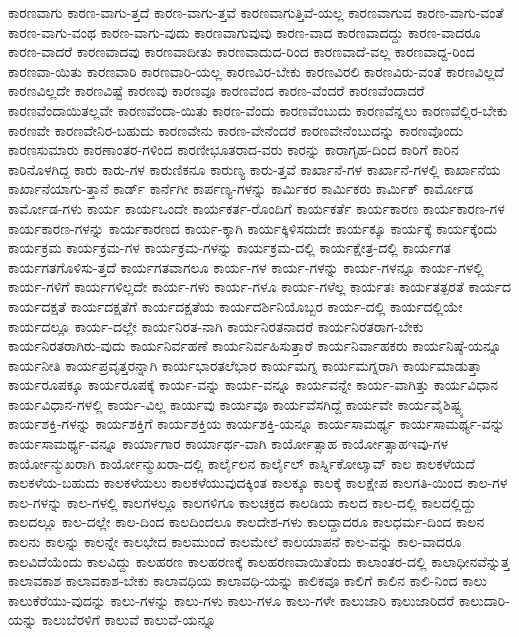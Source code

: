 {ಕಾರಣವಾಗು
ಕಾರಣ-ವಾಗು-ತ್ತದೆ
ಕಾರಣ-ವಾಗು-ತ್ತವೆ
ಕಾರಣವಾಗುತ್ತಿವೆ-ಯಲ್ಲ
ಕಾರಣವಾಗುವ
ಕಾರಣ-ವಾಗು-ವಂತೆ
ಕಾರಣ-ವಾಗು-ವಂಥ
ಕಾರಣ-ವಾಗು-ವುದು
ಕಾರಣವಾಗುವುವು
ಕಾರಣ-ವಾದ
ಕಾರಣವಾದದ್ದು
ಕಾರಣ-ವಾದರೂ
ಕಾರಣ-ವಾದರೆ
ಕಾರಣವಾದವು
ಕಾರಣವಾದೀತು
ಕಾರಣವಾದುದ-ರಿಂದ
ಕಾರಣವಾದೆ-ವಲ್ಲ
ಕಾರಣವಾದ್ದ-ರಿಂದ
ಕಾರಣವಾ-ಯಿತು
ಕಾರಣವಾರಿ
ಕಾರಣವಾರಿ-ಯಲ್ಲ
ಕಾರಣವಿರ-ಬೇಕು
ಕಾರಣವಿರಲಿ
ಕಾರಣವಿರು-ವಂತೆ
ಕಾರಣವಿಲ್ಲದೆ
ಕಾರಣವಿಲ್ಲದೇ
ಕಾರಣವಿಷ್ಟೆ
ಕಾರಣವು
ಕಾರಣವೂ
ಕಾರಣವೆಂದ
ಕಾರಣ-ವೆಂದರೆ
ಕಾರಣವೆಂದಾದರೆ
ಕಾರಣವೆಂದಾಯಿತಲ್ಲವೇ
ಕಾರಣವೆಂದಾ-ಯಿತು
ಕಾರಣ-ವೆಂದು
ಕಾರಣವೆಂಬುದು
ಕಾರಣವೆನ್ನಲು
ಕಾರಣವೆಲ್ಲಿರ-ಬೇಕು
ಕಾರಣವೇ
ಕಾರಣವೇನಿರ-ಬಹುದು
ಕಾರಣವೇನು
ಕಾರಣ-ವೇನೆಂದರೆ
ಕಾರಣವೇನೆಂಬುದನ್ನು
ಕಾರಣವೊಂದು
ಕಾರಣಸುಮಾರು
ಕಾರಣಾಂತರ-ಗಳಿಂದ
ಕಾರಣೀಭೂತರಾದ-ವರು
ಕಾರನ್ನು
ಕಾರಾಗೃಹ-ದಿಂದ
ಕಾರಿಗೆ
ಕಾರಿನ
ಕಾರಿನೊಳಗಿದ್ದ
ಕಾರು
ಕಾರು-ಗಳ
ಕಾರುಣಿಕನೂ
ಕಾರುಣ್ಯ
ಕಾರು-ತ್ತವೆ
ಕಾರ್ಖಾನೆ-ಗಳ
ಕಾರ್ಖಾನೆ-ಗಳಲ್ಲಿ
ಕಾರ್ಖಾನೆಯ
ಕಾರ್ಖಾನೆಯಾಗು-ತ್ತಾನೆ
ಕಾರ್ಡ್
ಕಾರ್ನೆಗೀ
ಕಾರ್ಪಣ್ಯ-ಗಳನ್ನು
ಕಾರ್ಮಿಕರ
ಕಾರ್ಮಿಕರು
ಕಾರ್ಮಿಕ್
ಕಾರ್ಮೋಡ
ಕಾರ್ಮೋಡ-ಗಳು
ಕಾರ್ಯ
ಕಾರ್ಯಒಂದೇ
ಕಾರ್ಯಕರ್ತ-ರೊಂದಿಗೆ
ಕಾರ್ಯಕರ್ತೆ
ಕಾರ್ಯಕಾರಣ
ಕಾರ್ಯಕಾರಣ-ಗಳ
ಕಾರ್ಯಕಾರಣ-ಗಳನ್ನು
ಕಾರ್ಯಕಾರಣದ
ಕಾರ್ಯ-ಕ್ಕಾಗಿ
ಕಾರ್ಯಕ್ಕಿಳಿಸದುದೇ
ಕಾರ್ಯಕ್ಕೂ
ಕಾರ್ಯಕ್ಕೆ
ಕಾರ್ಯಕ್ಕೆಂದು
ಕಾರ್ಯಕ್ರಮ
ಕಾರ್ಯಕ್ರಮ-ಗಳ
ಕಾರ್ಯಕ್ರಮ-ಗಳನ್ನು
ಕಾರ್ಯಕ್ರಮ-ದಲ್ಲಿ
ಕಾರ್ಯಕ್ಷೇತ್ರ-ದಲ್ಲಿ
ಕಾರ್ಯಗತ
ಕಾರ್ಯಗತಗೊಳಿಸು-ತ್ತದೆ
ಕಾರ್ಯಗತವಾಗಲೂ
ಕಾರ್ಯ-ಗಳ
ಕಾರ್ಯ-ಗಳನ್ನು
ಕಾರ್ಯ-ಗಳನ್ನೂ
ಕಾರ್ಯ-ಗಳಲ್ಲಿ
ಕಾರ್ಯ-ಗಳಿಗೆ
ಕಾರ್ಯಗಳಿಲ್ಲದೇ
ಕಾರ್ಯ-ಗಳು
ಕಾರ್ಯ-ಗಳೂ
ಕಾರ್ಯ-ಗಳೆಲ್ಲ
ಕಾರ್ಯತಃ
ಕಾರ್ಯತತ್ಪರತೆ
ಕಾರ್ಯದ
ಕಾರ್ಯದಕ್ಷತೆ
ಕಾರ್ಯದಕ್ಷತೆಗೆ
ಕಾರ್ಯದಕ್ಷತೆಯ
ಕಾರ್ಯದರ್ಶಿನಿಯೊಬ್ಬರ
ಕಾರ್ಯ-ದಲ್ಲಿ
ಕಾರ್ಯದಲ್ಲಿಯೇ
ಕಾರ್ಯದಲ್ಲೂ
ಕಾರ್ಯ-ದಲ್ಲೇ
ಕಾರ್ಯನಿರತ-ನಾಗಿ
ಕಾರ್ಯನಿರತನಾದರೆ
ಕಾರ್ಯನಿರತರಾಗ-ಬೇಕು
ಕಾರ್ಯನಿರತರಾಗಿರು-ವುದು
ಕಾರ್ಯನಿರ್ವಹಣೆ
ಕಾರ್ಯನಿರ್ವಹಿಸುತ್ತಾರೆ
ಕಾರ್ಯನಿರ್ವಾಹಕರು
ಕಾರ್ಯನಿಷ್ಠೆ-ಯನ್ನೂ
ಕಾರ್ಯನೀತಿ
ಕಾರ್ಯಪ್ರವೃತ್ತರನ್ನಾಗಿ
ಕಾರ್ಯಭಾರತಲೆಭಾರ
ಕಾರ್ಯಮಗ್ನ
ಕಾರ್ಯಮಗ್ನರಾಗಿ
ಕಾರ್ಯಮಾಡುತ್ತಾ
ಕಾರ್ಯರೂಪಕ್ಕೂ
ಕಾರ್ಯರೂಪಕ್ಕೆ
ಕಾರ್ಯ-ವನ್ನು
ಕಾರ್ಯ-ವನ್ನೂ
ಕಾರ್ಯವನ್ನೇ
ಕಾರ್ಯ-ವಾಗಿತ್ತು
ಕಾರ್ಯವಿಧಾನ
ಕಾರ್ಯವಿಧಾನ-ಗಳಲ್ಲಿ
ಕಾರ್ಯ-ವಿಲ್ಲ
ಕಾರ್ಯವು
ಕಾರ್ಯವೂ
ಕಾರ್ಯವೆಸಗಿದ್ದೆ
ಕಾರ್ಯವೇ
ಕಾರ್ಯವೈಶಿಷ್ಟ್ಯ
ಕಾರ್ಯಶಕ್ತಿ-ಗಳನ್ನು
ಕಾರ್ಯಶಕ್ತಿಗೆ
ಕಾರ್ಯಶಕ್ತಿಯ
ಕಾರ್ಯಶಕ್ತಿ-ಯನ್ನೂ
ಕಾರ್ಯಸಾಮರ್ಥ್ಯ
ಕಾರ್ಯಸಾಮರ್ಥ್ಯ-ವನ್ನು
ಕಾರ್ಯಸಾಮರ್ಥ್ಯ-ವನ್ನೂ
ಕಾರ್ಯಾಗಾರ
ಕಾರ್ಯಾರ್ಥ-ವಾಗಿ
ಕಾರ್ಯೋತ್ಸಾಹ
ಕಾರ್ಯೋತ್ಸಾಹಇವು-ಗಳ
ಕಾರ್ಯೋನ್ಮುಖರಾಗಿ
ಕಾರ್ಯೋನ್ಮುಖರಾ-ದಲ್ಲಿ
ಕಾರ್ಲೈಲನ
ಕಾರ್ಲೈಲ್
ಕಾರ್ಸ್ನಿಕೋಲಾೖವ್
ಕಾಲ
ಕಾಲಕಳೆಯದೆ
ಕಾಲಕಳೆಯ-ಬಹುದು
ಕಾಲಕಳೆಯಲು
ಕಾಲಕಳೆಯುವುದಕ್ಕಿಂತ
ಕಾಲಕ್ಕೂ
ಕಾಲಕ್ಕೆ
ಕಾಲಕ್ಷೇಪ
ಕಾಲಗತಿ-ಯಿಂದ
ಕಾಲ-ಗಳ
ಕಾಲ-ಗಳನ್ನು
ಕಾಲ-ಗಳಲ್ಲಿ
ಕಾಲಗಳಲ್ಲೂ
ಕಾಲಗಳಿಗೂ
ಕಾಲಚಕ್ರದ
ಕಾಲಡಿಯ
ಕಾಲದ
ಕಾಲ-ದಲ್ಲಿ
ಕಾಲದಲ್ಲಿದ್ದು
ಕಾಲದಲ್ಲೂ
ಕಾಲ-ದಲ್ಲೇ
ಕಾಲ-ದಿಂದ
ಕಾಲದಿಂದಲೂ
ಕಾಲದೇಶ-ಗಳು
ಕಾಲದ್ದಾದರೂ
ಕಾಲಧರ್ಮ-ದಿಂದ
ಕಾಲನ
ಕಾಲನು
ಕಾಲನ್ನು
ಕಾಲನ್ನೇ
ಕಾಲಭೇದ
ಕಾಲಮುಂದೆ
ಕಾಲಮೇಲೆ
ಕಾಲಯಾಪನೆ
ಕಾಲ-ವನ್ನು
ಕಾಲ-ವಾದರೂ
ಕಾಲವಿದೆಯೆಂದು
ಕಾಲವಿದ್ದು
ಕಾಲಹರಣ
ಕಾಲಹರಣಕ್ಕೆ
ಕಾಲಹರಣವಾಯಿತೆಂದು
ಕಾಲಾಂತರ-ದಲ್ಲಿ
ಕಾಲಾಧೀನವೆನ್ನುತ್ತ
ಕಾಲಾವಕಾಶ
ಕಾಲಾವಕಾಶ-ಬೇಕು
ಕಾಲಾವಧಿಯ
ಕಾಲಾವಧಿ-ಯನ್ನು
ಕಾಲಿಕವೂ
ಕಾಲಿಗೆ
ಕಾಲಿನ
ಕಾಲಿ-ನಿಂದ
ಕಾಲು
ಕಾಲುಕೆರೆಯು-ವುದನ್ನು
ಕಾಲು-ಗಳನ್ನು
ಕಾಲು-ಗಳು
ಕಾಲು-ಗಳೂ
ಕಾಲು-ಗಳೇ
ಕಾಲುಜಾರಿ
ಕಾಲುಜಾರಿದರೆ
ಕಾಲುದಾರಿ-ಯನ್ನು
ಕಾಲುಬೆರಳಿಗೆ
ಕಾಲುವೆ
ಕಾಲುವೆ-ಯನ್ನೂ
}
